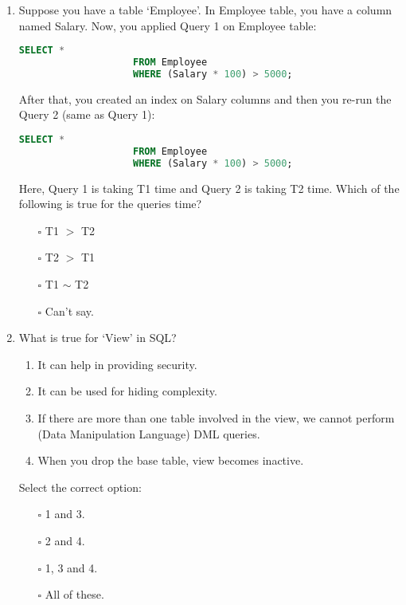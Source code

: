 \documentclass[10pt]{article}
\begin{document}
\begin{enumerate}
			\item Suppose you have a table ‘Employee’. In Employee table, you have a column named Salary. Now, you applied Query 1 on Employee table:
				\begin{lstlisting}[language=SQL,firstline=1, lastline=3] 
					SELECT * 
					FROM Employee 
					WHERE (Salary * 100) > 5000;
				\end{lstlisting}
				After that, you created an index on Salary columns and then you re-run the Query 2 (same as Query 1):
				\begin{lstlisting}[language=SQL,firstline=1, lastline=3] 
					SELECT * 
					FROM Employee 
					WHERE (Salary * 100) > 5000;
				\end{lstlisting}
				Here, Query 1 is taking T1 time and Query 2 is taking T2 time. Which of the following is true for the queries time?
				\begin{enumerate}
					\item[$\square$] T1 $>$ T2
					\item[$\square$] T2 $>$ T1
					\item[$\square$] T1 $\sim$ T2
					\item[$\square$] Can’t say.
				\end{enumerate}
				
			\item What is true for ‘View’ in SQL?
				\begin{enumerate}
					\item It can help in providing security.
					\item It can be used for hiding complexity.
					\item If there are more than one table involved in the view, we cannot perform (Data Manipulation Language) DML queries.
					\item When you drop the base table, view becomes inactive.
				\end{enumerate}
				Select the correct option:
				\begin{enumerate}
					\item[$\square$] 1 and 3.
					\item[$\square$] 2 and 4.
					\item[$\square$] 1, 3 and 4.
					\item[$\square$] All of these.
				\end{enumerate}

			\newpage
			

\end{enumerate}
\end{document}
